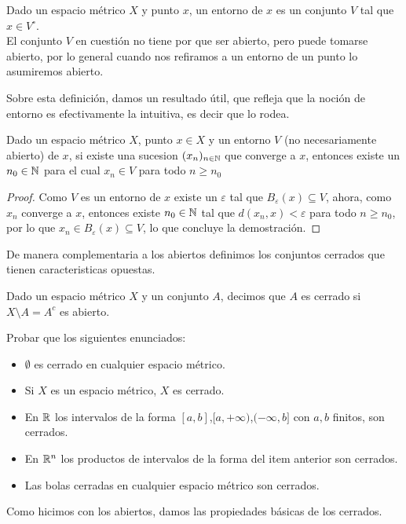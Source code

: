 \documentclass[12pt,a4paper]{book}
\begin{document}
\begin{defi} 
Dado un espacio métrico $X$ y punto $x$, un entorno de $x$ es un conjunto $V$ tal que $x \in V^\circ$.\\
El conjunto $V$ en cuestión no tiene por que ser abierto, pero puede tomarse abierto, por lo general cuando nos refiramos a un entorno de un punto lo asumiremos abierto.
\end{defi}
Sobre esta definición, damos un resultado útil, que refleja que la noción de entorno es efectivamente la intuitiva, es decir que lo rodea.
\begin{prop}
Dado un espacio métrico $X$, punto $x \in X$ y un entorno $V$ (no necesariamente abierto) de $x$, si existe una sucesion $(x_n)_{{n} \in \mathbb{N}}$ que converge a $x$, entonces existe un $n_0 \in \mathbb{N}$ para el cual $x_n \in V$ para todo $n \geq n_0$
\begin{proof}
Como $V$ es un entorno de $x$ existe un $\varepsilon$ tal que $B_\varepsilon(x) \subseteq V$, ahora, como $x_n$ converge a $x$, entonces existe $n_0 \in \mathbb{N}$ tal que $d(x_n,x)< \varepsilon$ para todo $n \geq n_0$, por lo que $x_n \in B_\varepsilon(x) \subseteq V$, lo que concluye la demostración.
\end{proof}
\end{prop}
De manera complementaria a los abiertos definimos los conjuntos cerrados que tienen caracteristicas opuestas.
\begin{defi}
Dado un espacio métrico $X$ y un conjunto $A$, decimos que $A$ es cerrado si $X \setminus A = A^c$ es abierto.
\end{defi}
\begin{ej} Probar que los siguientes enunciados:
\begin{itemize}
\item $\emptyset$ es cerrado en cualquier espacio métrico.
\item Si $X$ es un espacio métrico, $X$ es cerrado.
\item En $\mathbb{R}$ los intervalos de la forma $[a,b]$,$[a, +\infty)$,$(-\infty,b]$ con $a,b$ finitos, son cerrados.
\item En $\mathbb{R}^n$ los productos de intervalos de la forma del item anterior son cerrados.
\item Las bolas cerradas en cualquier espacio métrico son cerrados.
\end{itemize}
\end{ej}
Como hicimos con los abiertos, damos las propiedades básicas de los cerrados.
\end{document}
